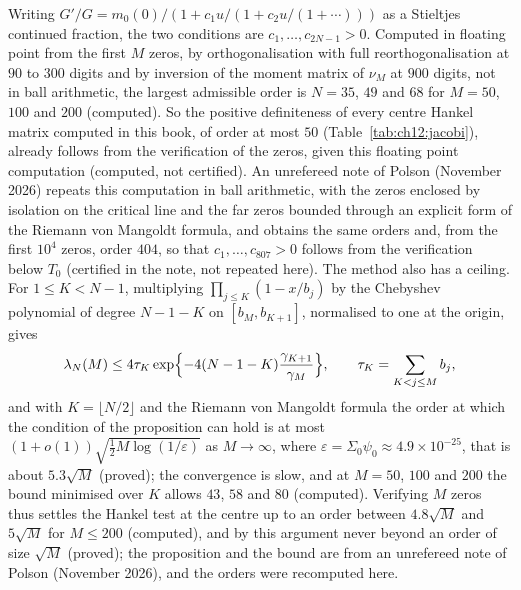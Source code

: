 Writing $G'/G=m_0(0)/(1+c_1u/(1+c_2u/(1+\cdots)))$ as a Stieltjes continued fraction, the two conditions are $c_1,\dots,c_{2N-1}>0$. Computed in floating point from the first $M$ zeros, by orthogonalisation with full reorthogonalisation at $90$ to $300$ digits and by inversion of the moment matrix of $\nu_M$ at $900$ digits, not in ball arithmetic, the largest admissible order is $N=35$, $49$ and $68$ for $M=50$, $100$ and $200$ (computed). So the positive definiteness of every centre Hankel matrix computed in this book, of order at most $50$ (Table~\ref{tab:ch12:jacobi}), already follows from the verification of the zeros, given this floating point computation (computed, not certified). An unrefereed note of Polson (November 2026) repeats this computation in ball arithmetic, with the zeros enclosed by isolation on the critical line and the far zeros bounded through an explicit form of the Riemann von Mangoldt formula, and obtains the same orders and, from the first $10^4$ zeros, order $404$, so that $c_1,\dots,c_{807}>0$ follows from the verification below $T_0$ (certified in the note, not repeated here). The method also has a ceiling. For $1\le K<N-1$, multiplying $\prod_{j\le K}(1-x/b_j)$ by the Chebyshev polynomial of degree $N-1-K$ on $[b_M,b_{K+1}]$, normalised to one at the origin, gives
\[
\lambda_N(M)\le4\tau_K\exp\Bigl\{-4(N-1-K)\frac{\gamma_{K+1}}{\gamma_M}\Bigr\},\qquad\tau_K=\sum_{K<j\le M}b_j,
\]
and with $K=\lfloor N/2\rfloor$ and the Riemann von Mangoldt formula the order at which the condition of the proposition can hold is at most $(1+o(1))\sqrt{\frac12M\log(1/\varepsilon)}$ as $M\to\infty$, where $\varepsilon=\Sigma_0\psi_0\approx4.9\times10^{-25}$, that is about $5.3\sqrt M$ (proved); the convergence is slow, and at $M=50$, $100$ and $200$ the bound minimised over $K$ allows $43$, $58$ and $80$ (computed). Verifying $M$ zeros thus settles the Hankel test at the centre up to an order between $4.8\sqrt M$ and $5\sqrt M$ for $M\le200$ (computed), and by this argument never beyond an order of size $\sqrt M$ (proved); the proposition and the bound are from an unrefereed note of Polson (November 2026), and the orders were recomputed here.

